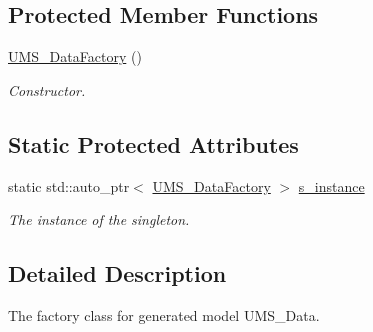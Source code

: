 \subsection*{Protected Member Functions}
\begin{DoxyCompactItemize}
\item 
\hypertarget{classUMS__Data_1_1UMS__DataFactory_a792d45ee2b535e91bea90cf1d5171b6e}{
\hyperlink{classUMS__Data_1_1UMS__DataFactory_a792d45ee2b535e91bea90cf1d5171b6e}{UMS\_\-DataFactory} ()}
\label{classUMS__Data_1_1UMS__DataFactory_a792d45ee2b535e91bea90cf1d5171b6e}

\begin{DoxyCompactList}\small\item\em Constructor. \item\end{DoxyCompactList}\end{DoxyCompactItemize}
\subsection*{Static Protected Attributes}
\begin{DoxyCompactItemize}
\item 
\hypertarget{classUMS__Data_1_1UMS__DataFactory_aecaa18e0aae14f3cda88d59cf6f7ff65}{
static std::auto\_\-ptr$<$ \hyperlink{classUMS__Data_1_1UMS__DataFactory}{UMS\_\-DataFactory} $>$ \hyperlink{classUMS__Data_1_1UMS__DataFactory_aecaa18e0aae14f3cda88d59cf6f7ff65}{s\_\-instance}}
\label{classUMS__Data_1_1UMS__DataFactory_aecaa18e0aae14f3cda88d59cf6f7ff65}

\begin{DoxyCompactList}\small\item\em The instance of the singleton. \item\end{DoxyCompactList}\end{DoxyCompactItemize}


\subsection{Detailed Description}
The factory class for generated model UMS\_\-Data. 

